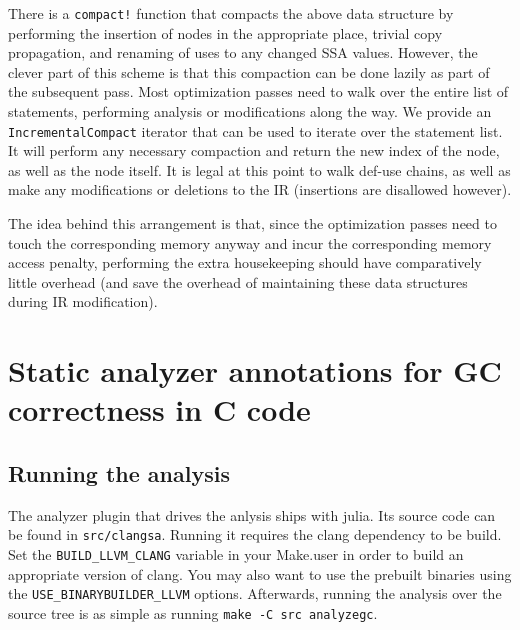 There is a \texttt{compact!} function that compacts the above data structure by performing the insertion of nodes in the appropriate place, trivial copy propagation, and renaming of uses to any changed SSA values. However, the clever part of this scheme is that this compaction can be done lazily as part of the subsequent pass. Most optimization passes need to walk over the entire list of statements, performing analysis or modifications along the way. We provide an \texttt{IncrementalCompact} iterator that can be used to iterate over the statement list. It will perform any necessary compaction and return the new index of the node, as well as the node itself. It is legal at this point to walk def-use chains, as well as make any modifications or deletions to the IR (insertions are disallowed however).



The idea behind this arrangement is that, since the optimization passes need to touch the corresponding memory anyway and incur the corresponding memory access penalty, performing the extra housekeeping should have comparatively little overhead (and save the overhead of maintaining these data structures during IR modification).



\hypertarget{3374914057216712271}{}


\section{Static analyzer annotations for GC correctness in C code}



\hypertarget{10926948174874297988}{}


\subsection{Running the analysis}



The analyzer plugin that drives the anlysis ships with julia. Its source code can be found in \texttt{src/clangsa}. Running it requires the clang dependency to be build. Set the \texttt{BUILD\_LLVM\_CLANG} variable in your Make.user in order to build an appropriate version of clang. You may also want to use the prebuilt binaries using the \texttt{USE\_BINARYBUILDER\_LLVM} options. Afterwards, running the analysis over the source tree is as simple as running \texttt{make -C src analyzegc}.



